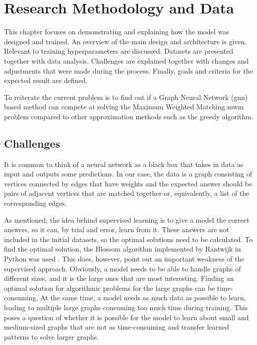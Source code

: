 \chapter{Research Methodology and Data}

This chapter focuses on demonstrating and explaining how the model was designed and trained. An overview of the main design and architecture is given. Relevant to training hyperparameters are discussed. Datasets are presented together with data analysis. Challenges are explained together with changes and adjustments that were made during the process. Finally, goals and criteria for the expected result are defined.

To reiterate the current problem is to find out if a Graph Neural Network (\gls{gnn}) based method can compete at solving the Maximum Weighted Matching \gls{mwm} problem compared to other approximation methods such as the greedy algorithm.

\section{Challenges}

It is common to think of a neural network as a black box that takes in data as input and outputs some predictions. In our case, the data is a graph consisting of vertices connected by edges that have weights and the expected answer should be pairs of adjacent vertices that are matched together or, equivalently, a list of the corresponding edges.

As mentioned, the idea behind supervised learning is to give a model the correct answers, so it can, by trial and error, learn from it. These answers are not included in the initial datasets, so the optimal solutions need to be calculated. To find the optimal solution, the Blossom algorithm implemented by Rantwijk in Python was used \cite{mwmBlossom}. This does, however, point out an important weakness of the supervised approach. Obviously, a model needs to be able to handle graphs of different sizes, and it is the large ones that are most interesting. Finding an optimal solution for algorithmic problems for the large graphs can be time-consuming. At the same time, a model needs as much data as possible to learn, leading to multiple large graphs consuming too much time during training. This poses a question of whether it is possible for the model to learn about small and medium-sized graphs that are not as time-consuming and transfer learned patterns to solve larger graphs.

